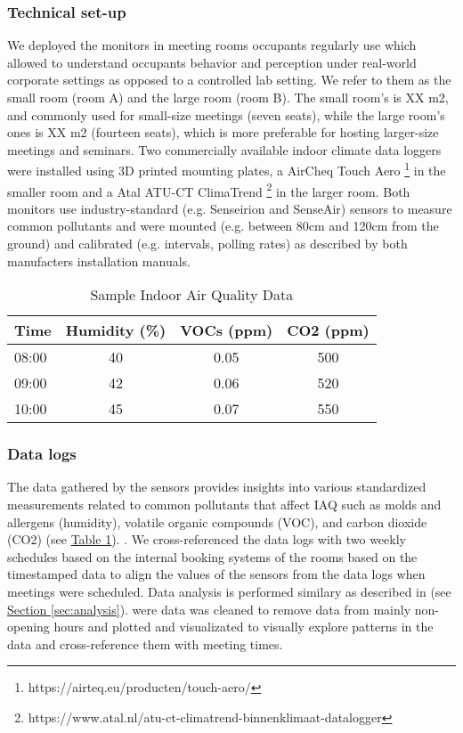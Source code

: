 \subsubsection{Technical set-up}

We deployed the monitors in meeting rooms occupants regularly use which allowed to understand occupants behavior and perception under real-world corporate settings as opposed to a controlled lab setting. We refer to them as the small room (room A) and the large room (room B). The small room’s is XX m2, and commonly used for small-size meetings (seven seats), while the large room’s ones is XX m2 (fourteen seats), which is more preferable for hosting larger-size meetings and seminars. Two commercially available indoor climate data loggers were installed using 3D printed mounting plates, a AirCheq Touch Aero \footnote{https://airteq.eu/producten/touch-aero/} in the smaller room and a Atal ATU-CT ClimaTrend \footnote{https://www.atal.nl/atu-ct-climatrend-binnenklimaat-datalogger} in the larger room. Both monitors use industry-standard (e.g. Senseirion and SenseAir) sensors to measure common pollutants and were mounted (e.g. between 80cm and 120cm from the ground) and calibrated (e.g. intervals, polling rates) as described by both manufacters installation manuals.

\begin{table}[htbp]
    \centering
    \caption{Sample Indoor Air Quality Data}
    \begin{tabular}{lccc}
        \toprule
        \textbf{Time} & \textbf{Humidity (\%)} & \textbf{VOCs (ppm)} & \textbf{CO2 (ppm)} \\
        \midrule
        08:00 & 40 & 0.05 & 500 \\
        09:00 & 42 & 0.06 & 520 \\
        10:00 & 45 & 0.07 & 550 \\
        \bottomrule
    \end{tabular}
    \label{tab:air-quality}
\end{table}

\subsubsection{Data logs}

The data gathered by the sensors provides insights into various standardized measurements related to common pollutants that affect IAQ such as molds and allergens (humidity), volatile organic compounds (VOC), and carbon dioxide (CO2) (see \hyperref[tab:air-quality]{Table \ref*{tab:air-quality}}).
. We cross-referenced the data logs with two weekly schedules based on the internal booking systems of the rooms based on the timestamped data to align the values of the sensors from the data logs when meetings were scheduled.
Data analysis is performed similary as described in (see \hyperref[sec:analysis]{Section \ref*{sec:analysis}}). were data was cleaned to remove data from mainly non-opening hours and plotted and visualizated to visually explore patterns in the data and cross-reference them with meeting times.


